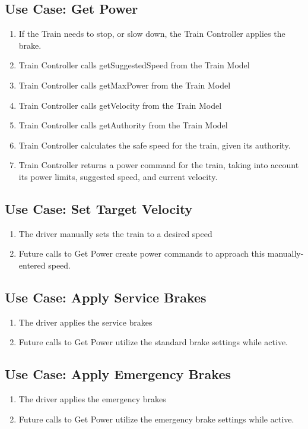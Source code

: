 \documentclass{scrreprt}
\begin{document}
\subsection{Use Case: Get Power}
\begin{enumerate}
	\item If the Train needs to stop, or slow down, the Train Controller applies the brake.
	\item Train Controller calls getSuggestedSpeed from the Train Model
	\item Train Controller calls getMaxPower from the Train Model
	\item Train Controller calls getVelocity from the Train Model
	\item Train Controller calls getAuthority from the Train Model
	\item Train Controller calculates the safe speed for the train, given its authority.
	\item Train Controller returns a power command for the  train, taking into account its power limits, suggested speed, and current velocity.
\end{enumerate}

\subsection{Use Case: Set Target Velocity}
\begin{enumerate}
	\item The driver manually sets the train to a desired speed
	\item Future calls to Get Power create power commands to approach this manually-entered speed.
\end{enumerate}

\subsection{Use Case: Apply Service Brakes}
\begin{enumerate}
	\item The driver applies the service brakes
	\item Future calls to Get Power utilize the standard brake settings while active.
\end{enumerate}

\subsection{Use Case: Apply Emergency Brakes}
\begin{enumerate}
	\item The driver applies the emergency brakes
	\item Future calls to Get Power utilize the emergency brake settings while active.
\end{enumerate}
\end{document}
